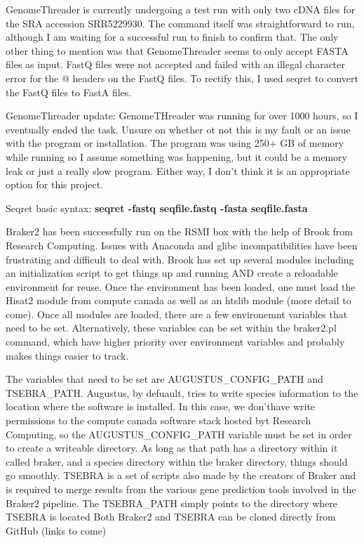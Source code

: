 \documentclass[12pt]{article}
\begin{document}
GenomeThreader is currently undergoing a test run with only two cDNA
files for the SRA accession SRR5229930. The command itself was
straightforward to run, although I am waiting for a successful run to
finish to confirm that. The only other thing to mention was that
GenomeThreader seems to only accept FASTA files as input. FastQ files
were not accepted and failed with an illegal character error for the @
headers on the FastQ files. To rectify this, I used seqret to convert
the FastQ files to FastA files.

GenomeThreader update: GenomeTHreader was running for over 1000 hours,
so I eventually ended the task. Unsure on whether ot not this is my
fault or an issue with the program or installation. The program was
using 250+ GB of memory while running so I assume something was
happening, but it could be a memory leak or just a really slow
program. Either way, I don't think it is an appropriate option for
this project.

Seqret basic syntax:
\textbf{seqret -fastq seqfile.fastq -fasta seqfile.fasta}


Braker2 has been successfully run on the RSMI box with the help of
Brook from Research Computing. Issues with Anaconda and glibc
incompatibilities have been frustrating and difficult to deal
with. Brook has set up several modules including an initialization
script to get things up and running AND create a reloadable
environment for reuse. Once the environment has been loaded, one must
load the Hisat2 module from compute canada as well as an htslib module
(more detail to come). Once all modules are loaded, there are a few
environemnt variables that need to be set. Alternatively, these
variables can be set within the braker2.pl command, which have higher
priority over environment variables and probably makes things easier
to track.

The variables that need to be set are AUGUSTUS\_CONFIG\_PATH and
TSEBRA\_PATH. Augustus, by defuault, tries to write species
information to the location where the software is installed. In this
case, we don'thave write permissions to the compute canada software
stack hosted byt Research Computing, so the AUGUSTUS\_CONFIG\_PATH
variable must be set in order to create a writeable directory. As long
as that path has a directory within it called braker, and a species
directory within the braker directory, things should go
smoothly. TSEBRA is a set of scripts also made by the creators of
Braker and is required to merge results from the various gene
prediction tools involved in the Braker2 pipeline. The TSEBRA\_PATH
simply points to the directory where TSEBRA is located Both Braker2
and TSEBRA can be cloned directly from GitHub (links to come)
\end{document}
